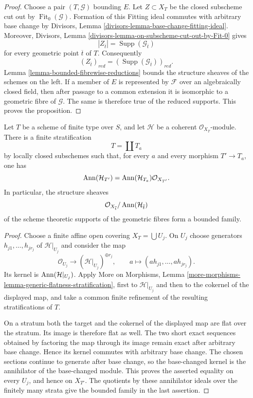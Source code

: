 \begin{proof}
Choose a pair $(T, \mathcal{G})$ bounding $E$. Let
$Z \subset X_T$ be the closed subscheme cut out by
$\operatorname{Fit}_0(\mathcal{G})$. Formation of this Fitting ideal
commutes with arbitrary base change by Divisors, Lemma
\ref{divisors-lemma-base-change-fitting-ideal}. Moreover, Divisors, Lemma
\ref{divisors-lemma-on-subscheme-cut-out-by-Fit-0} gives
$$
|Z_{\overline{t}}|=\operatorname{Supp}(\mathcal{G}_{\overline{t}})
$$
for every geometric point $\overline{t}$ of $T$. Consequently
$$
(Z_{\overline{t}})_{red}=
(\operatorname{Supp}(\mathcal{G}_{\overline{t}}))_{red}.
$$
Lemma \ref{lemma-bounded-fibrewise-reductions} bounds the structure sheaves
of the schemes on the left. If a member of $E$ is represented by
$\mathcal{F}$ over an algebraically closed field, then after passage to a
common extension it is isomorphic to a geometric fibre of $\mathcal{G}$.
The same is therefore true of the reduced supports. This proves the
proposition.
\end{proof}


\begin{lemma}
\label{lemma-annihilator-stratification}
Let $T$ be a scheme of finite type over $S$, and let $\mathcal{H}$ be a
coherent $\mathcal{O}_{X_T}$-module. There is a finite stratification
$$
T = \coprod T_a
$$
by locally closed subschemes such that, for every $a$ and every morphism
$T' \to T_a$, one has
$$
\mathop{\rm Ann}(\mathcal{H}_{T'}) =
\mathop{\rm Ann}(\mathcal{H}_{T_a})\mathcal{O}_{X_{T'}}.
$$
In particular, the structure sheaves
$$
\mathcal{O}_{X_{\overline{t}}}/
\mathop{\rm Ann}(\mathcal{H}_{\overline{t}})
$$
of the scheme theoretic supports of the geometric fibres form a bounded
family.
\end{lemma}

\begin{proof}
Choose a finite affine open covering $X_T = \bigcup U_j$. On $U_j$ choose
generators $h_{j1}, \ldots, h_{jr_j}$ of $\mathcal{H}|_{U_j}$ and consider
the map
$$
\mathcal{O}_{U_j} \longrightarrow
(\mathcal{H}|_{U_j})^{\oplus r_j},\qquad
a \longmapsto (ah_{j1},\ldots,ah_{jr_j}).
$$
Its kernel is $\mathop{\rm Ann}(\mathcal{H}|_{U_j})$. Apply More on
Morphisms, Lemma
\ref{more-morphisms-lemma-generic-flatness-stratification}, first to
$\mathcal{H}|_{U_j}$ and then to the cokernel of the displayed map, and
take a common finite refinement of the resulting stratifications of $T$.

On a stratum both the target and the cokernel of the displayed map are
flat over the stratum. Its image is therefore flat as well. The two short
exact sequences obtained by factoring the map through its image remain
exact after arbitrary base change. Hence its kernel commutes with arbitrary
base change. The chosen sections continue to generate after base change,
so the base-changed kernel is the annihilator of the base-changed module.
This proves the asserted equality on every $U_j$, and hence on $X_{T'}$.
The quotients by these annihilator ideals over the finitely many strata
give the bounded family in the last assertion.
\end{proof}


